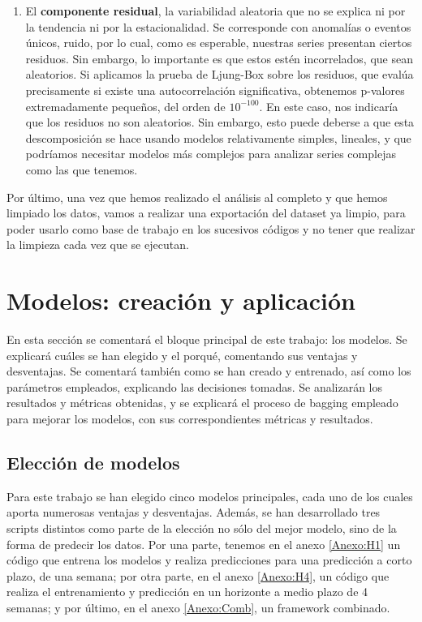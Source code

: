 \documentclass[a4paper,onecolumn]{extarticle}
\let\stdsection\section
\renewcommand\section{\newpage\stdsection}
\begin{document}
\begin{sloppypar}
\begin{enumerate}
    correctamente.
    \item El \textbf{componente residual}, la variabilidad aleatoria que no se explica ni por la tendencia ni por la estacionalidad. Se corresponde con anomalías o eventos únicos, ruido, 
    por lo cual, como es esperable, nuestras series presentan ciertos residuos. Sin embargo, lo importante es que estos estén incorrelados, que sean aleatorios. Si aplicamos la prueba de
    Ljung-Box sobre los residuos, que evalúa precisamente si existe una autocorrelación significativa, obtenemos p-valores extremadamente pequeños, del orden de $10^{-100}$.
    En este caso, nos indicaría que los residuos no son aleatorios. Sin embargo, esto puede deberse a que esta descomposición se hace usando modelos relativamente simples, lineales, 
    y que podríamos necesitar modelos más complejos para analizar series complejas como las que tenemos.
\end{enumerate}

Por último, una vez que hemos realizado el análisis al completo y que hemos limpiado los datos, vamos a realizar una exportación del dataset ya limpio, para poder usarlo como 
base de trabajo en los sucesivos códigos y no tener que realizar la limpieza cada vez que se ejecutan.

\section{Modelos: creación y aplicación} \label{modelos}
En esta sección se comentará el bloque principal de este trabajo: los modelos. Se explicará cuáles se han elegido y el porqué, comentando sus ventajas y desventajas. Se comentará también 
como se han creado y entrenado, así como los parámetros empleados, explicando las decisiones tomadas. Se analizarán los resultados y métricas obtenidas, y se explicará el proceso de bagging 
empleado para mejorar los modelos, con sus correspondientes métricas y resultados.

\subsection{Elección de modelos} \label{eleccion}
Para este trabajo se han elegido cinco modelos principales, cada uno de los cuales aporta numerosas ventajas y desventajas. Además, se han desarrollado tres scripts distintos 
como parte de la elección no sólo del mejor modelo, sino de la forma de predecir los datos. Por una parte, tenemos en el anexo \ref{Anexo:H1} un código que entrena los modelos y 
realiza predicciones para una predicción a corto plazo, de una semana; por otra parte, en el anexo \ref{Anexo:H4}, un código que realiza el entrenamiento y predicción en un horizonte
a medio plazo de 4 semanas; y por último, en el anexo \ref{Anexo:Comb}, un framework combinado.


\end{sloppypar}
\end{document}
